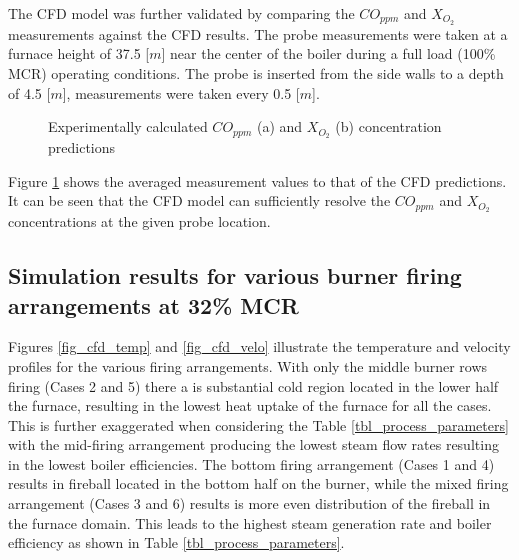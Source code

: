 \documentclass[review]{elsarticle}
\begin{document}
The CFD model was further validated by comparing the $CO_{ppm}$ and $X_{O_{2}}$ measurements against the CFD results. The probe measurements were taken at a furnace height of 37.5 [$m$] near the center of the boiler during a full load (100\% MCR) operating conditions. The probe is inserted from the side walls to a depth of 4.5 [$m$], measurements were taken every 0.5 [$m$].\\
\begin{figure}[h!]
\centering
{}
\hspace{5mm}
\caption{Experimentally calculated $CO_{ppm}$ (a) and $X_{O_{2}}$ (b) concentration predictions}
\label{fig_probe_valid}
\end{figure}

Figure \ref{fig_probe_valid} shows the averaged measurement values to that of the CFD predictions. It can be seen that the CFD model can sufficiently resolve the $CO_{ppm}$ and $X_{O_{2}}$ concentrations at the given probe location.
\newpage
\subsection{Simulation results for various burner firing arrangements at 32\% MCR }

Figures \ref{fig_cfd_temp} and \ref{fig_cfd_velo} illustrate the temperature and velocity profiles for the various firing arrangements. With only the middle burner rows firing (Cases 2 and 5) there a is substantial cold region located in the lower half the furnace, resulting in the lowest heat uptake of the furnace for all the cases. This is further exaggerated when considering the Table \ref{tbl_process_parameters} with the mid-firing arrangement producing the lowest steam flow rates resulting in the lowest boiler efficiencies. The bottom firing arrangement (Cases 1 and 4) results in fireball located in the bottom half on the burner, while the mixed firing arrangement (Cases 3 and 6) results is more even distribution of the fireball in the furnace domain. This leads to the highest steam generation rate and boiler efficiency as shown in Table \ref{tbl_process_parameters}.
\end{document}
